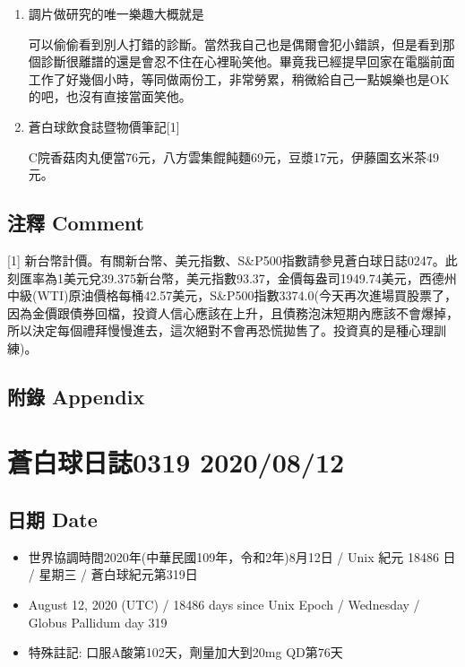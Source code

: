 \documentclass[a5paper, 11pt
]{book}
\providecommand{\tightlist}{%
  \setlength{\itemsep}{0pt}\setlength{\parskip}{0pt}}
\begin{document}
\begin{enumerate}
\def\labelenumi{\arabic{enumi}.}
\item
  調片做研究的唯一樂趣大概就是

  可以偷偷看到別人打錯的診斷。當然我自己也是偶爾會犯小錯誤，但是看到那個診斷很離譜的還是會忍不住在心裡恥笑他。畢竟我已經提早回家在電腦前面工作了好幾個小時，等同做兩份工，非常勞累，稍微給自己一點娛樂也是OK的吧，也沒有直接當面笑他。
\item
  蒼白球飲食誌暨物價筆記{[}1{]}

  C院香菇肉丸便當76元，八方雲集餛飩麵69元，豆漿17元，伊藤園玄米茶49元。
\end{enumerate}

\hypertarget{ux6ce8ux91cb-comment-62}{%
\subsection{注釋 Comment}\label{ux6ce8ux91cb-comment-62}}

{[}1{]}
新台幣計價。有關新台幣、美元指數、S\&P500指數請參見蒼白球日誌0247。此刻匯率為1美元兌39.375新台幣，美元指數93.37，金價每盎司1949.74美元，西德州中級(WTI)原油價格每桶42.57美元，S\&P500指數3374.0(今天再次進場買股票了，因為金價跟債券回檔，投資人信心應該在上升，且債務泡沫短期內應該不會爆掉，所以決定每個禮拜慢慢進去，這次絕對不會再恐慌拋售了。投資真的是種心理訓練)。

\hypertarget{ux9644ux9304-appendix-62}{%
\subsection{附錄 Appendix}\label{ux9644ux9304-appendix-62}}

\hypertarget{ux84bcux767dux7403ux65e5ux8a8c0319-20200812}{%
\section{蒼白球日誌0319
2020/08/12}\label{ux84bcux767dux7403ux65e5ux8a8c0319-20200812}}

\hypertarget{ux65e5ux671f-date-63}{%
\subsection{日期 Date}\label{ux65e5ux671f-date-63}}

\begin{itemize}
\tightlist
\item
  世界協調時間2020年(中華民國109年，令和2年)8月12日 / Unix 紀元 18486 日
  / 星期三 / 蒼白球紀元第319日
\item
  August 12, 2020 (UTC) / 18486 days since Unix Epoch / Wednesday /
  Globus Pallidum day 319
\item
  特殊註記: 口服A酸第102天，劑量加大到20mg QD第76天
\end{itemize}
\end{document}
